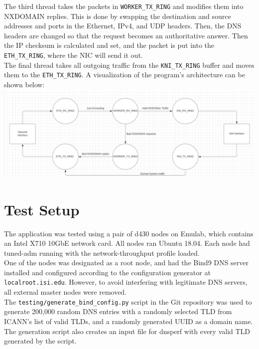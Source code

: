 \documentclass[12pt]{extarticle}
\begin{document}
The third thread takes the packets in \texttt{WORKER\_TX\_RING} and modifies them into NXDOMAIN replies. This is done by swapping the destination and source addresses and ports in the Ethernet, IPv4, and UDP headers. Then, the DNS headers are changed so that the request becomes an authoritative answer. Then the IP checksum is calculated and set, and the packet is put into the \texttt{ETH\_TX\_RING}, where the NIC will send it out. \\

The final thread takes all outgoing traffic from the \texttt{KNI\_TX\_RING} buffer and moves them to the \texttt{ETH\_TX\_RING}. A visualization of the program's architecture can be shown below: \\

\noindent
\includegraphics[width=\textwidth]{buf_layout.png}

\section{Test Setup}
The application was tested using a pair of d430 nodes on Emulab, which contains an Intel X710 10GbE network card. All nodes ran Ubuntu 18.04. Each node had tuned-adm running with the network-throughput profile loaded. \\

One of the nodes was designated as a root node, and had the Bind9 DNS server installed and configured according to the configuration generator at \texttt{localroot.isi.edu}. However, to avoid interfering with legitimate DNS servers, all external master nodes were removed. \\

The \texttt{testing/generate\_bind\_config.py} script in the Git repository was used to generate 200,000 random DNS entries with a randomly selected TLD from ICANN's list of valid TLDs, and a randomly generated UUID as a domain name. The generation script also creates an input file for dnsperf with every valid TLD generated by the script. \\
\end{document}
